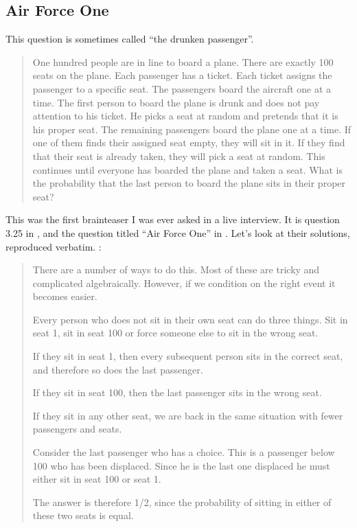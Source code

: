 \documentclass[a4paper]{article}
\begin{document}
\subsection{Air Force One}
\label{q:airforceone}
This question is sometimes called ``the drunken passenger''.
\begin{quote}
One hundred people are in line to board a plane.
There are exactly 100 seats on the plane.
Each passenger has a ticket. Each ticket assigns the passenger to a specific seat.
The passengers board the aircraft one at a time.
The first person to board the plane is drunk and does not pay attention to his ticket.
He picks a seat at random and pretends that it is his proper seat.
The remaining passengers board the plane one at a time. If one of them finds their assigned seat empty, they will sit in it.
If they find that their seat is already taken, they will pick a seat at random.
This continues until everyone has boarded the plane and taken a seat.
What is the probability that the last person to board the plane sits in their proper seat?
\end{quote}
This was the first brainteaser I was ever asked in a live interview.
It is question 3.25 in \citet{JoshiQA}, and the question titled ``Air Force One'' in \citet{WilmottFAQ}.
Let's look at their solutions, reproduced verbatim.
\citet{JoshiQA}:
\begin{quote}
There are a number of ways to do this. Most of
these are tricky and complicated algebraically. However, if we condition on the
right event it becomes easier.

Every person who does not sit in their own seat can do three things. Sit in
seat 1, sit in seat 100 or force someone else to sit in the wrong seat.

If they sit in seat 1, then every subsequent person sits in the correct seat,
and therefore so does the last passenger.

If they sit in seat 100, then the last passenger sits in the wrong seat.

If they sit in any other seat, we are back in the same situation with fewer
passengers and seats.

Consider the last passenger who has a choice. This is a passenger below 100
who has been displaced. Since he is the last one displaced he must either sit in
seat 100 or seat 1.

The answer is therefore 1/2, since the probability of sitting in either of these
two seats is equal.
\end{quote}
\end{document}
